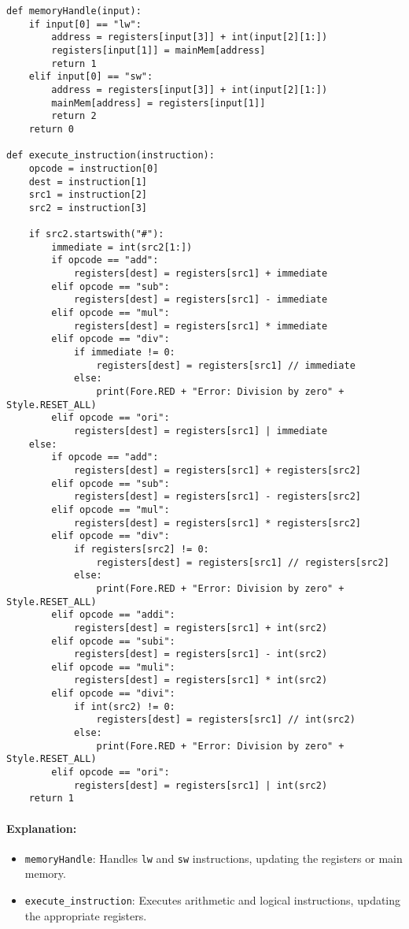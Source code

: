 \documentclass{article}
\begin{document}
\begin{lstlisting}[caption={Memory Handling and Execution}]
def memoryHandle(input):
    if input[0] == "lw":
        address = registers[input[3]] + int(input[2][1:])
        registers[input[1]] = mainMem[address]
        return 1
    elif input[0] == "sw":
        address = registers[input[3]] + int(input[2][1:])
        mainMem[address] = registers[input[1]]
        return 2
    return 0

def execute_instruction(instruction):
    opcode = instruction[0]
    dest = instruction[1]
    src1 = instruction[2]
    src2 = instruction[3]

    if src2.startswith("#"):
        immediate = int(src2[1:])
        if opcode == "add":
            registers[dest] = registers[src1] + immediate
        elif opcode == "sub":
            registers[dest] = registers[src1] - immediate
        elif opcode == "mul":
            registers[dest] = registers[src1] * immediate
        elif opcode == "div":
            if immediate != 0:
                registers[dest] = registers[src1] // immediate
            else:
                print(Fore.RED + "Error: Division by zero" + Style.RESET_ALL)
        elif opcode == "ori":
            registers[dest] = registers[src1] | immediate
    else:
        if opcode == "add":
            registers[dest] = registers[src1] + registers[src2]
        elif opcode == "sub":
            registers[dest] = registers[src1] - registers[src2]
        elif opcode == "mul":
            registers[dest] = registers[src1] * registers[src2]
        elif opcode == "div":
            if registers[src2] != 0:
                registers[dest] = registers[src1] // registers[src2]
            else:
                print(Fore.RED + "Error: Division by zero" + Style.RESET_ALL)
        elif opcode == "addi":
            registers[dest] = registers[src1] + int(src2)
        elif opcode == "subi":
            registers[dest] = registers[src1] - int(src2)
        elif opcode == "muli":
            registers[dest] = registers[src1] * int(src2)
        elif opcode == "divi":
            if int(src2) != 0:
                registers[dest] = registers[src1] // int(src2)
            else:
                print(Fore.RED + "Error: Division by zero" + Style.RESET_ALL)
        elif opcode == "ori":
            registers[dest] = registers[src1] | int(src2)
    return 1
\end{lstlisting}

\paragraph{Explanation:}
\begin{itemize}
    \item \texttt{memoryHandle}: Handles \texttt{lw} and \texttt{sw} instructions, updating the registers or main memory.
    \item \texttt{execute\_instruction}: Executes arithmetic and logical instructions, updating the appropriate registers.
\end{itemize}
\end{document}
